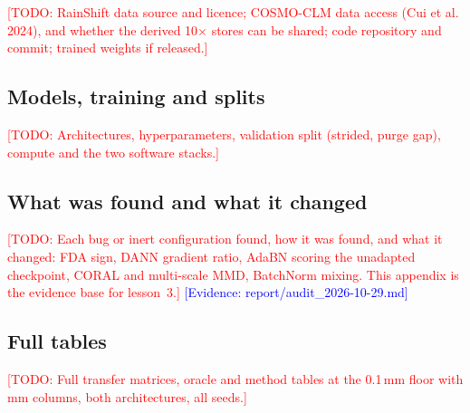 \documentclass{ametsocV6.2}
\newcommand{\todo}[1]{\textcolor{red}{[TODO: #1]}}
\newcommand{\ev}[1]{\textcolor{blue}{[Evidence: #1]}}
\begin{document}
\availstatement
\todo{RainShift data source and licence; COSMO-CLM data access (Cui et
al. 2024), and whether the derived 10$\times$ stores can be shared; code
repository and commit; trained weights if released.}


\appendix[A]
\subsection*{Models, training and splits}
\todo{Architectures, hyperparameters, validation split (strided, purge
gap), compute and the two software stacks.}

\appendix[B]
\subsection*{What was found and what it changed}
\todo{Each bug or inert configuration found, how it was found, and what
it changed: FDA sign, DANN gradient ratio, AdaBN scoring the unadapted
checkpoint, CORAL and multi-scale MMD, BatchNorm mixing. This appendix is
the evidence base for lesson~3.}
\ev{report/audit\_2026-10-29.md}

\appendix[C]
\subsection*{Full tables}
\todo{Full transfer matrices, oracle and method tables at the 0.1\,mm
floor with mm columns, both architectures, all seeds.}

\clearpage



\end{document}
